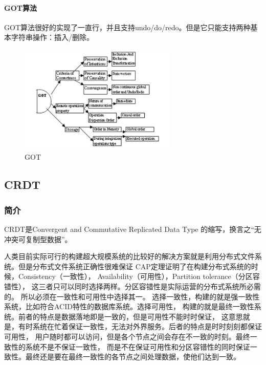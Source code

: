 \documentclass[11pt]{ctexart}
\begin{document}
\paragraph{GOT算法}
GOT算法很好的实现了一直行，并且支持undo/do/redo。但是它只能支持两种基本字符串操作：插入/删除。
\begin{figure}[H]
    \begin{center}
    \includegraphics[width=0.67\textwidth]{figures/GOT.png}
    \caption{GOT}
    \end{center}
\end{figure}
\subsection{CRDT}
\subsubsection{简介}
CRDT是Convergent and Commutative Replicated Data Type 
的缩写，换言之“无冲突可复制型数据”。

人类目前实际可行的构建超大规模系统的比较好的解决方案就是利用分布式文件系统。但是分布式文件系统正确性很难保证
CAP定理证明了在构建分布式系统的时候，Consistency（一致性），
Availability（可用性），Partition tolerance（分区容错性），
这三者只可以同时选择两样。分区容错性是实际运营的分布式系统所必需的。
所以必须在一致性和可用性中选择其一。
选择一致性，构建的就是强一致性系统，比如符合ACID特性的数据库系统。选择可用性，
构建的就是最终一致性系统。前者的特点是数据落地即是一致的，但是可用性不能时时保证，
这意思就是，有时系统在忙着保证一致性，无法对外界服务。后者的特点是时时刻刻都保证可用性，
用户随时都可以访问，但是各个节点之间会存在不一致的时刻。最终一致性的系统不是不保证一致性，
而是不在保证可用性和分区容错性的同时保证一致性。最终还是要在最终一致性的各节点之间处理数据，使他们达到一致。
\end{document}
